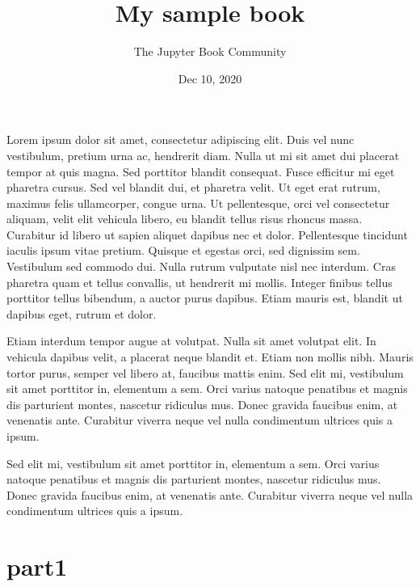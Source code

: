 \documentclass[letterpaper,10pt,english]{jupyterBook}
\title{My sample book}
\date{Dec 10, 2020}
\author{The Jupyter Book Community}
\begin{document}
\pagestyle{empty}
\sphinxmaketitle
\pagestyle{plain}
\sphinxtableofcontents
\pagestyle{normal}
\label{\detokenize{intro::doc}}


Lorem ipsum dolor sit amet, consectetur adipiscing elit. Duis vel nunc vestibulum, pretium urna ac, hendrerit diam. Nulla ut mi sit amet dui placerat tempor at quis magna. Sed porttitor blandit consequat. Fusce efficitur mi eget pharetra cursus. Sed vel blandit dui, et pharetra velit. Ut eget erat rutrum, maximus felis ullamcorper, congue urna. Ut pellentesque, orci vel consectetur aliquam, velit elit vehicula libero, eu blandit tellus risus rhoncus massa. Curabitur id libero ut sapien aliquet dapibus nec et dolor. Pellentesque tincidunt iaculis ipsum vitae pretium. Quisque et egestas orci, sed dignissim sem. Vestibulum sed commodo dui. Nulla rutrum vulputate nisl nec interdum. Cras pharetra quam et tellus convallis, ut hendrerit mi mollis. Integer finibus tellus porttitor tellus bibendum, a auctor purus dapibus. Etiam mauris est, blandit ut dapibus eget, rutrum et dolor.

\begin{DUlineblock}{0em}
\item[] 
\end{DUlineblock}

Etiam interdum tempor augue at volutpat. Nulla sit amet volutpat elit. In vehicula dapibus velit, a placerat neque blandit et. Etiam non mollis nibh. Mauris tortor purus, semper vel libero at, faucibus mattis enim. Sed elit mi, vestibulum sit amet porttitor in, elementum a sem. Orci varius natoque penatibus et magnis dis parturient montes, nascetur ridiculus mus. Donec gravida faucibus enim, at venenatis ante. Curabitur viverra neque vel nulla condimentum ultrices quis a ipsum.

\begin{DUlineblock}{0em}
\item[] 
\end{DUlineblock}

Sed elit mi, vestibulum sit amet porttitor in, elementum a sem. Orci varius natoque penatibus et magnis dis parturient montes, nascetur ridiculus mus. Donec gravida faucibus enim, at venenatis ante. Curabitur viverra neque vel nulla condimentum ultrices quis a ipsum.


\part{part1}
\end{document}
